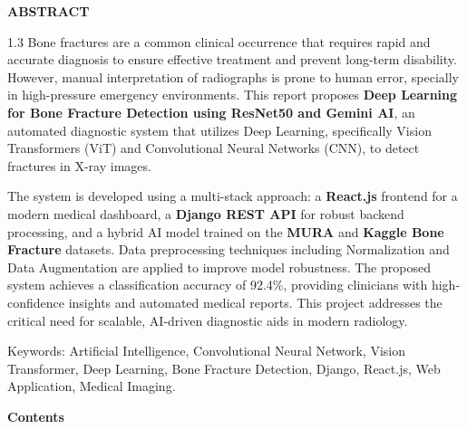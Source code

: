 \documentclass[a4paper,12pt]{report}
\begin{document}
    \begin{titlepage}
    \begin{center}
    \vspace*{2cm}
    \textbf{\LARGE ABSTRACT}\\[2em]
    \end{center}

    \begin{spacing}{1.3}
    \justifying
    Bone fractures are a common clinical occurrence that requires rapid and accurate diagnosis to ensure effective treatment and prevent long-term disability. However, manual interpretation of radiographs is prone to human error, specially in high-pressure emergency environments. This report proposes \textbf{Deep Learning for Bone Fracture Detection using ResNet50 and Gemini AI}, an automated diagnostic system that utilizes Deep Learning, specifically Vision Transformers (ViT) and Convolutional Neural Networks (CNN), to detect fractures in X-ray images.

    The system is developed using a multi-stack approach: a \textbf{React.js} frontend for a modern medical dashboard, a \textbf{Django REST API} for robust backend processing, and a hybrid AI model trained on the \textbf{MURA} and \textbf{Kaggle Bone Fracture} datasets. Data preprocessing techniques including Normalization and Data Augmentation are applied to improve model robustness. The proposed system achieves a classification accuracy of 92.4\%, providing clinicians with high-confidence insights and automated medical reports. This project addresses the critical need for scalable, AI-driven diagnostic aids in modern radiology.

    Keywords: Artificial Intelligence, Convolutional Neural Network, Vision Transformer, Deep Learning, Bone Fracture Detection, Django, React.js, Web Application, Medical Imaging.

    \vspace{2em}
    \noindent
    \end{spacing}
    \end{titlepage}


    \begin{center}
    \textbf{\Large Contents}
    \end{center}

    \vspace{0.5cm}
\end{document}
